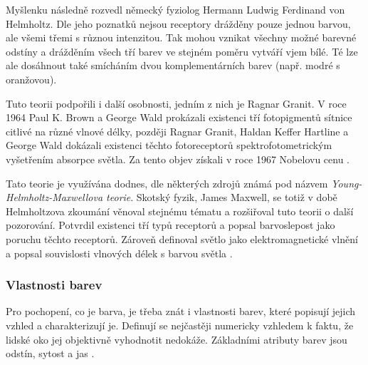 Myšlenku následně rozvedl německý fyziolog Hermann Ludwig Ferdinand von Helmholtz. Dle jeho poznatků nejsou receptory drážděny pouze jednou barvou,
ale všemi třemi s různou intenzitou. Tak mohou vznikat všechny možné barevné odstíny a drážděním všech tří barev ve stejném poměru vytváří vjem bílé.
Té lze ale dosáhnout také smícháním dvou komplementárních barev (např. modré s oranžovou).

Tuto teorii podpořili i další osobnosti, jedním z nich je Ragnar Granit. V roce 1964 Paul K. Brown a George Wald prokázali existenci tří fotopigmentů sítnice citlivé
na různé vlnové délky, později Ragnar Granit, Haldan Keffer Hartline a George Wald dokázali existenci těchto fotoreceptorů spektrofotometrickým vyšetřením
absorpce světla. Za tento objev získali v roce 1967 Nobelovu cenu \cite{vackova2013teorie}.

Tato teorie je využívána dodnes, dle některých zdrojů známá pod názvem \emph{Young-Helmholtz-Maxwellova teorie}. Skotský fyzik, James Maxwell, se totiž v době Helmholtzova zkoumání věnoval stejnému
tématu a rozšiřoval tuto teorii o další pozorování. Potvrdil existenci tří typů receptorů a popsal barvoslepost jako poruchu těchto receptorů. Zároveň definoval světlo jako
elektromagnetické vlnění a popsal souvislosti vlnových délek s barvou světla \cite{958782}.


\subsubsection{Vlastnosti barev}
Pro pochopení, co je barva, je třeba znát i vlastnosti barev, které popisují jejich vzhled a charakterizují je. Definují se nejčastěji numericky vzhledem k faktu,
že lidské oko jej objektivně vyhodnotit nedokáže. Základními atributy barev jsou odstín, sytost a jas \cite{jelen2023vliv_barev}.

